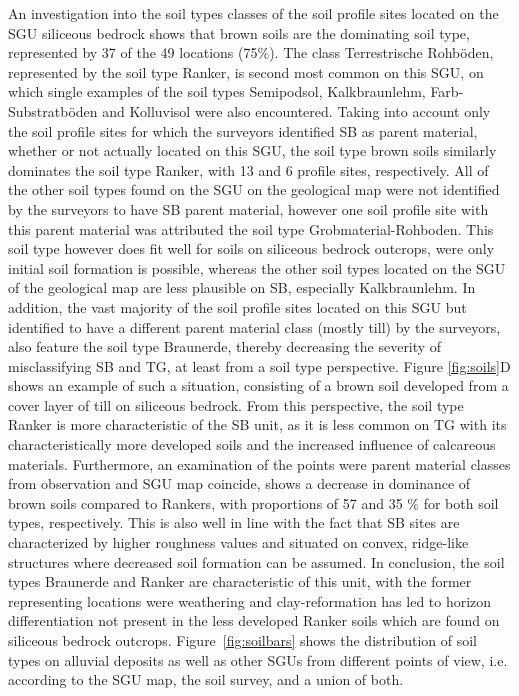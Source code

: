 \documentclass[preprint,12pt,authoryear]{elsarticle}
\begin{document}
An investigation into the soil types classes of the soil profile sites located on the SGU siliceous bedrock shows that brown soils are the dominating soil type, represented by 37 of the 49 locations (75\%). The class Terrestrische Rohb\"oden, represented by the soil type Ranker, is second most common on this SGU, on which single examples of the soil types Semipodsol, Kalkbraunlehm, Farb-Substratb\"oden and Kolluvisol were also encountered. Taking into account only the soil profile sites for which the surveyors identified SB as parent material, whether or not actually located on this SGU, the soil type brown soils similarly dominates the soil type Ranker, with 13 and 6 profile sites, respectively. All of the other soil types found on the SGU on the geological map were not identified by the surveyors to have SB parent material, however one soil profile site with this parent material was attributed the soil type Grobmaterial-Rohboden. This soil type however does fit well for soils on siliceous bedrock outcrops, were only initial soil formation is possible, whereas the other soil types located on the SGU of the geological map are less plausible on SB, especially Kalkbraunlehm. In addition, the vast majority of the soil profile sites located on this SGU but identified to have a different parent material class (mostly till)  by the surveyors, also feature the soil type Braunerde, thereby decreasing the severity of misclassifying SB and TG, at least from a soil type perspective. Figure \ref{fig:soils}D shows an example of such a situation, consisting of a brown soil developed from a cover layer of till on siliceous bedrock. From this perspective, the soil type Ranker is more characteristic of the SB unit, as it is less common on TG with its characteristically more developed soils and the increased influence of  calcareous materials. Furthermore, an examination of the points were parent material classes from observation and SGU map coincide, shows a decrease in dominance of brown soils compared to Rankers, with proportions of 57 and 35 \% for both soil types, respectively. This is also well in line with the fact that SB sites are characterized by higher roughness values and situated on convex, ridge-like structures where decreased soil formation can be assumed. In conclusion, the soil types Braunerde and Ranker are characteristic of this unit, with the former representing locations were weathering and clay-reformation has led to horizon differentiation not present in the less developed Ranker soils which are found on siliceous bedrock outcrops. Figure~\ref{fig:soilbars} shows the distribution of soil types on alluvial deposits as well as other SGUs from different points of view, i.e. according to the SGU map, the soil survey, and a union of both. 
\end{document}
